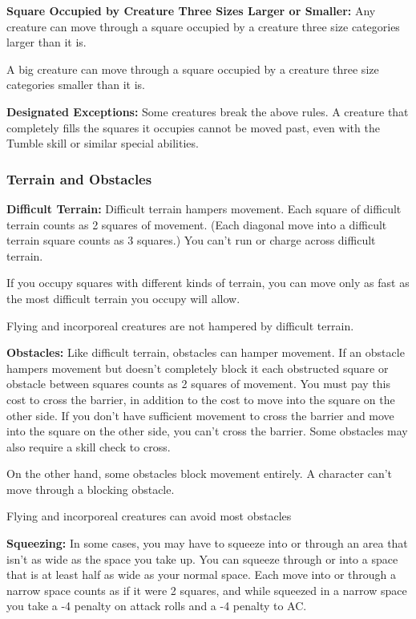 \documentclass{article}
\begin{document}
\textbf{Square Occupied by Creature Three Sizes Larger or Smaller:} Any creature 
can move through a square occupied by a creature three size categories larger than 
it is.

A big creature can move through a square occupied by a creature three size categories 
smaller than it is.

\textbf{Designated Exceptions:} Some creatures break the above rules. A creature 
that completely fills the squares it occupies cannot be moved past, even with the 
Tumble skill or similar special abilities.

\vspace{12pt}
\subsubsection*{\textbf{Terrain and Obstacles}}

\textbf{Difficult Terrain: }Difficult terrain hampers movement. Each square of 
difficult terrain counts as 2 squares of movement. (Each diagonal move into a difficult 
terrain square counts as 3 squares.) You can't run or charge across difficult terrain.

If you occupy squares with different kinds of terrain, you can move only as fast 
as the most difficult terrain you occupy will allow.

Flying and incorporeal creatures are not hampered by difficult terrain.

\textbf{Obstacles:} Like difficult terrain, obstacles can hamper movement. If an 
obstacle hampers movement but doesn't completely block it each obstructed square 
or obstacle between squares counts as 2 squares of movement. You must pay this 
cost to cross the barrier, in addition to the cost to move into the square on the 
other side. If you don't have sufficient movement to cross the barrier and move 
into the square on the other side, you can't cross the barrier. Some obstacles 
may also require a skill check to cross.

On the other hand, some obstacles block movement entirely. A character can't move 
through a blocking obstacle.

Flying and incorporeal creatures can avoid most obstacles

\textbf{Squeezing:} In some cases, you may have to squeeze into or through an area 
that isn't as wide as the space you take up. You can squeeze through or into a 
space that is at least half as wide as your normal space. Each move into or through 
a narrow space counts as if it were 2 squares, and while squeezed in a narrow space 
you take a -4 penalty on attack rolls and a -4 penalty to AC.
\end{document}
